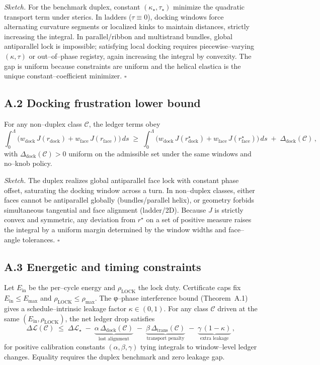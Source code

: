 \documentclass[11pt]{article}
\begin{document}
\emph{Sketch.} For the benchmark duplex, constant $(\kappa_\star,\tau_\star)$ minimize the quadratic transport term under sterics. In ladders ($\tau\equiv 0$), docking windows force alternating curvature segments or localized kinks to maintain distances, strictly increasing the integral. In parallel/ribbon and multistrand bundles, global antiparallel lock is impossible; satisfying local docking requires piecewise–varying $(\kappa,\tau)$ or out–of–phase registry, again increasing the integral by convexity. The gap is uniform because constraints are uniform and the helical elastica is the unique constant–coefficient minimizer. \hfill$\square$

\subsection*{A.2 Docking frustration lower bound}
\begin{lemma}\label{lem:dock}
For any non–duplex class $\mathcal{C}$, the ledger terms obey
\[
\int_0^\Lambda \!\big(w_{\mathrm{dock}}\,J(r_{\mathrm{dock}})+w_{\mathrm{face}}\,J(r_{\mathrm{face}})\big)\,ds
\;\ge\;
\int_0^\Lambda \!\big(w_{\mathrm{dock}}\,J(r_{\mathrm{dock}}^\star)+w_{\mathrm{face}}\,J(r_{\mathrm{face}}^\star)\big)\,ds
\;+\; \Delta_{\mathrm{dock}}(\mathcal{C})\,,
\]
with $\Delta_{\mathrm{dock}}(\mathcal{C})>0$ uniform on the admissible set under the same windows and no–knob policy.
\end{lemma}

\emph{Sketch.} The duplex realizes global antiparallel face lock with constant phase offset, saturating the docking window across a turn. In non–duplex classes, either faces cannot be antiparallel globally (bundles/parallel helix), or geometry forbids simultaneous tangential and face alignment (ladder/2D). Because $J$ is strictly convex and symmetric, any deviation from $r^\star$ on a set of positive measure raises the integral by a uniform margin determined by the window widths and face–angle tolerances. \hfill$\square$

\subsection*{A.3 Energetic and timing constraints}
Let $E_{\mathrm{in}}$ be the per–cycle energy and $\rho_{\mathrm{LOCK}}$ the lock duty. Certificate caps fix $E_{\mathrm{in}}\le E_{\max}$ and $\rho_{\mathrm{LOCK}}\le \rho_{\max}$. The φ–phase interference bound (Theorem~A.1) gives a schedule–intrinsic leakage factor $\kappa\in(0,1)$. For any class $\mathcal{C}$ driven at the same $(E_{\mathrm{in}},\rho_{\mathrm{LOCK}})$, the net ledger drop satisfies
\begin{equation}\label{eq:DLbound}
\Delta\mathcal{L}(\mathcal{C})
\;\le\;
\Delta\mathcal{L}_\star \;-\; \underbrace{\alpha\,\Delta_{\mathrm{dock}}(\mathcal{C})}_{\text{lost alignment}}
\;-\; \underbrace{\beta\,\Delta_{\mathrm{trans}}(\mathcal{C})}_{\text{transport penalty}}
\;-\; \underbrace{\gamma\,(1-\kappa)}_{\text{extra leakage}}\,,
\end{equation}
for positive calibration constants $(\alpha,\beta,\gamma)$ tying integrals to window–level ledger changes. Equality requires the duplex benchmark and zero leakage gap.
\end{document}
